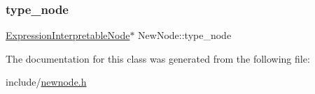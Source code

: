 \mbox{\label{classNewNode_a1cf62395c1531a22ca8e1932ed82910c}} 
\subsubsection{\texorpdfstring{type\+\_\+node}{type\_node}}
{\footnotesize\ttfamily \hyperlink{classExpressionInterpretableNode}{Expression\+Interpretable\+Node}$\ast$ New\+Node\+::type\+\_\+node}



The documentation for this class was generated from the following file\+:\begin{DoxyCompactItemize}
\item 
include/\hyperlink{newnode_8h}{newnode.\+h}\end{DoxyCompactItemize}
